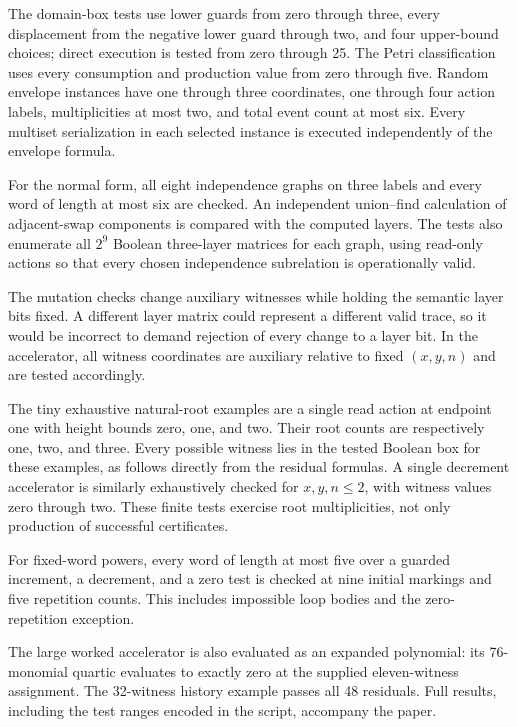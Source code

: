 \documentclass[11pt,a4paper]{article}
\theoremstyle{definition}
\theoremstyle{remark}
\begin{document}
The domain-box tests use lower guards from zero through three, every displacement from the negative lower guard through two, and four upper-bound choices; direct execution is tested from zero through 25. The Petri classification uses every consumption and production value from zero through five. Random envelope instances have one through three coordinates, one through four action labels, multiplicities at most two, and total event count at most six. Every multiset serialization in each selected instance is executed independently of the envelope formula.

For the normal form, all eight independence graphs on three labels and every word of length at most six are checked. An independent union--find calculation of adjacent-swap components is compared with the computed layers. The tests also enumerate all $2^9$ Boolean three-layer matrices for each graph, using read-only actions so that every chosen independence subrelation is operationally valid.

The mutation checks change auxiliary witnesses while holding the semantic layer bits fixed. A different layer matrix could represent a different valid trace, so it would be incorrect to demand rejection of every change to a layer bit. In the accelerator, all witness coordinates are auxiliary relative to fixed $(x,y,n)$ and are tested accordingly.

The tiny exhaustive natural-root examples are a single read action at endpoint one with height bounds zero, one, and two. Their root counts are respectively one, two, and three. Every possible witness lies in the tested Boolean box for these examples, as follows directly from the residual formulas. A single decrement accelerator is similarly exhaustively checked for $x,y,n\le2$, with witness values zero through two. These finite tests exercise root multiplicities, not only production of successful certificates.

For fixed-word powers, every word of length at most five over a guarded increment, a decrement, and a zero test is checked at nine initial markings and five repetition counts. This includes impossible loop bodies and the zero-repetition exception.

The large worked accelerator is also evaluated as an expanded polynomial: its 76-monomial quartic evaluates to exactly zero at the supplied eleven-witness assignment. The 32-witness history example passes all 48 residuals. Full results, including the test ranges encoded in the script, accompany the paper.
\end{document}
